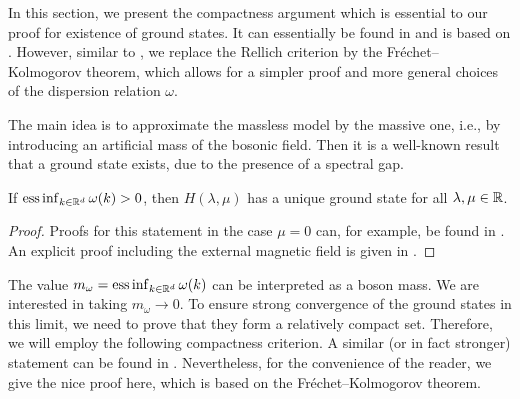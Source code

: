 \documentclass[a4paper,12pt,oneside]{article}
\begin{document}
In this section, we present the compactness argument which is essential to our proof for existence of ground states. It can essentially be found in \cite{HaslerHinrichsSiebert.2021a} and  is based on \cite{GriesemerLiebLoss.2001}. However, similar to \cite{Matte.2016,HiroshimaMatte.2019}, we replace the Rellich criterion by the Fr\'echet--Kolmogorov theorem, which allows for a simpler proof and more general choices of the dispersion relation $\omega$.

The main idea is to approximate the massless model by the massive one, i.e., by introducing an artificial mass of the bosonic field. Then it is a well-known result that a ground state exists, due to the presence of a spectral gap.
\begin{thm}\label{thm:massive}
	If $\operatorname*{ess\,inf}_{k\in{\mathbb R}^d} \omega(k) >0$, then $H(\lambda,\mu)$ has a unique ground state for all $\lambda,\mu\in{\mathbb R}$.
\end{thm}
\begin{proof}
	Proofs for this statement in the case $\mu=0$ can, for example, be found in \cite{AraiHirokawa.1995,DamMoller.2018a}. An explicit proof including the external magnetic field is given in \cite[Appendix D]{HaslerHinrichsSiebert.2021c}.
\end{proof}
The value $m_\omega= \operatorname*{ess\,inf}_{k\in{\mathbb R}^d} \omega(k)$ can be interpreted as a boson mass. We are interested in taking $m_\omega\to 0$. To ensure strong convergence of the ground states in this limit, we need to prove that they form a relatively compact set. Therefore, we will employ the following compactness criterion.
%
%
%
A similar (or in fact stronger) statement can be found in \cite[Proposition 3.8]{HiroshimaMatte.2019}. Nevertheless, for the convenience of the reader, we give the nice proof here, which is based on the Fr\'echet--Kolmogorov theorem.
\end{document}
